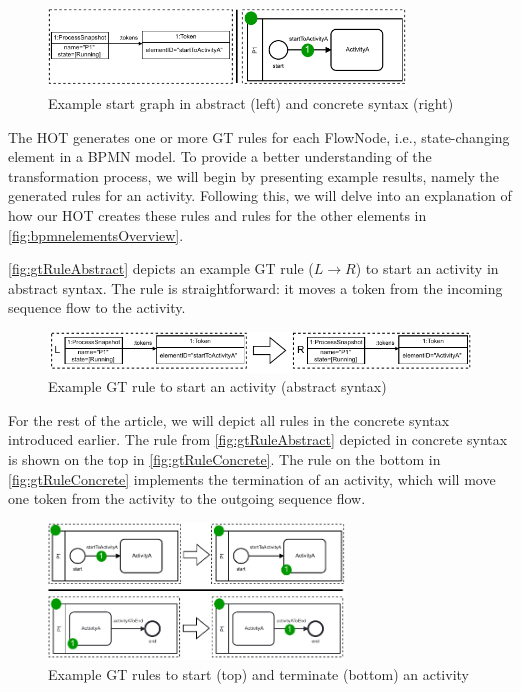 \documentclass{lmcs} %
\begin{document}
\begin{figure}[ht]
    \centering
    \includegraphics[width=0.85\textwidth]{images/startGraph.pdf}
    \caption{Example start graph in abstract (left) and concrete syntax (right)}
    \label{fig:startGraph}
\end{figure}


The HOT generates one or more GT rules for each \textsf{FlowNode}, i.e., state-changing element in a BPMN model.
To provide a better understanding of the transformation process, we will begin by presenting example results, namely the generated rules for an activity.
Following this, we will delve into an explanation of how our HOT creates these rules and rules for the other elements in \autoref{fig:bpmnelementsOverview}.

\autoref{fig:gtRuleAbstract} depicts an example GT rule ($L \to R$) to start an activity in abstract syntax.
The rule is straightforward: it moves a token from the incoming sequence flow to the activity.

\begin{figure}[ht]
    \centering
  \includegraphics[width=1\textwidth]{images/rule_abstract.pdf}
  \caption{Example GT rule to start an activity (abstract syntax)}  \label{fig:gtRuleAbstract}
\end{figure}

For the rest of the article, we will depict all rules in the concrete syntax introduced earlier.
The rule from \autoref{fig:gtRuleAbstract} depicted in concrete syntax is shown on the top in \autoref{fig:gtRuleConcrete}.
The rule on the bottom in \autoref{fig:gtRuleConcrete} implements the termination of an activity, which will move one token from the activity to the outgoing sequence flow.

\begin{figure}[ht]
    \centering
  \includegraphics[width=0.7\textwidth]{images/rule_concrete.pdf}
  \caption{Example GT rules to start (top) and terminate (bottom) an activity}
  \label{fig:gtRuleConcrete}
\end{figure}
\end{document}

